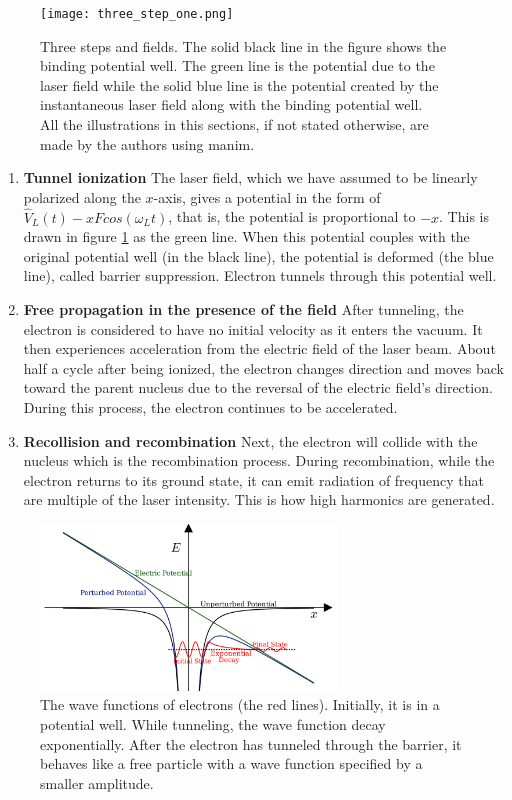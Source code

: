 \begin{figure}[h]
    \centering
    \texttt{[image: three\_step\_one.png]}
    \caption{Three steps and fields. The solid black line in the figure shows the binding potential well. The green line is the potential due to the laser field while the solid blue line is the potential created by the instantaneous laser field along with the binding potential well.\\All the illustrations in this sections, if not stated otherwise, are made by the authors using manim\cite{manim}.}
    \label{fig:3-step-1}
\end{figure}
\begin{enumerate}
    \item \textbf{Tunnel ionization} The laser field, which we have assumed to be linearly polarized along the $x$-axis, gives a potential in the form of \(\hat V_L(t)-xFcos(\omega_Lt)\), that is, the potential is proportional to $-x$. This is drawn in figure \ref{fig:3-step-1} as the green line. When this potential couples with the original potential well (in the black line), the potential is deformed (the blue line), called barrier suppression. Electron tunnels through this potential well.
    \item \textbf{Free propagation in the presence of the field} After tunneling, the electron is considered to have no initial velocity as it enters the vacuum. It then experiences acceleration from the electric field of the laser beam. About half a cycle after being ionized, the electron changes direction and moves back toward the parent nucleus due to the reversal of the electric field's direction. During this process, the electron continues to be accelerated.
    \item \textbf{Recollision and recombination} Next, the electron will collide with the nucleus which is the recombination process. During recombination, while the electron returns to its ground state, it can emit radiation of frequency that are multiple of the laser intensity. This is how high harmonics are generated.
\end{enumerate}


\begin{figure}[h]
    \centering
    \includegraphics[width=0.7\textwidth]{three_step_two.png}
    \caption{The wave functions of electrons (the red lines). Initially, it is in a potential well. While tunneling, the wave function decay exponentially. After the electron has tunneled through the barrier, it behaves like a free particle with a wave function specified by a smaller amplitude.}
    \label{fig:3-step-2}
\end{figure}

